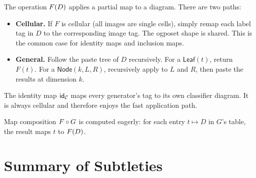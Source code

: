 \documentclass[acmsmall,screen,nonacm]{acmart}
\begin{document}
The operation $F(D)$ applies a partial map to a diagram. There
are two paths:

\begin{itemize}
  \item \textbf{Cellular.} If $F$ is cellular (all images are single
    cells), simply remap each label tag in $D$ to the corresponding image
    tag. The ogposet shape is shared. This is the common case for identity
    maps and inclusion maps.
  \item \textbf{General.} Follow the paste tree of $D$ recursively. For a
    $\mathsf{Leaf}(t)$, return $F(t)$. For a $\mathsf{Node}(k, L, R)$,
    recursively apply to $L$ and $R$, then paste the results at dimension
    $k$.
\end{itemize}

The identity map $\mathsf{id}_{\mathcal{C}}$ maps every generator's tag to its own
classifier diagram. It is always cellular and therefore enjoys the fast
application path.

Map composition $F \circ G$ is computed eagerly: for each entry
$t \mapsto D$ in $G$'s table, the result maps $t$ to $F(D)$.

\section{Summary of Subtleties}
\label{sec:pain}
\end{document}
